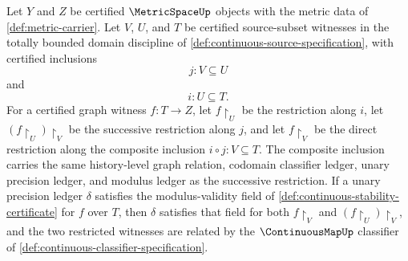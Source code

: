 
\begin{theorem}
\label{thm:uniform-continuity-modulus-restriction-transitive}
Let $Y$ and $Z$ be certified $\MetricSpaceUp$ objects with the metric data of \autoref{def:metric-carrier}. Let $V$, $U$, and $T$ be certified source-subset witnesses in the totally bounded domain discipline of \autoref{def:continuous-source-specification}, with certified inclusions
$$
j:V\subseteq U
$$
and
$$
i:U\subseteq T.
$$
For a certified graph witness $f:T\to Z$, let $f\!\restriction_U$ be the restriction along $i$, let $(f\!\restriction_U)\!\restriction_V$ be the successive restriction along $j$, and let $f\!\restriction_V$ be the direct restriction along the composite inclusion $i\circ j:V\subseteq T$. The composite inclusion carries the same history-level graph relation, codomain classifier ledger, unary precision ledger, and modulus ledger as the successive restriction. If a unary precision ledger $\delta$ satisfies the modulus-validity field of \autoref{def:continuous-stability-certificate} for $f$ over $T$, then $\delta$ satisfies that field for both $f\!\restriction_V$ and $(f\!\restriction_U)\!\restriction_V$, and the two restricted witnesses are related by the $\ContinuousMapUp$ classifier of \autoref{def:continuous-classifier-specification}.
\end{theorem}
